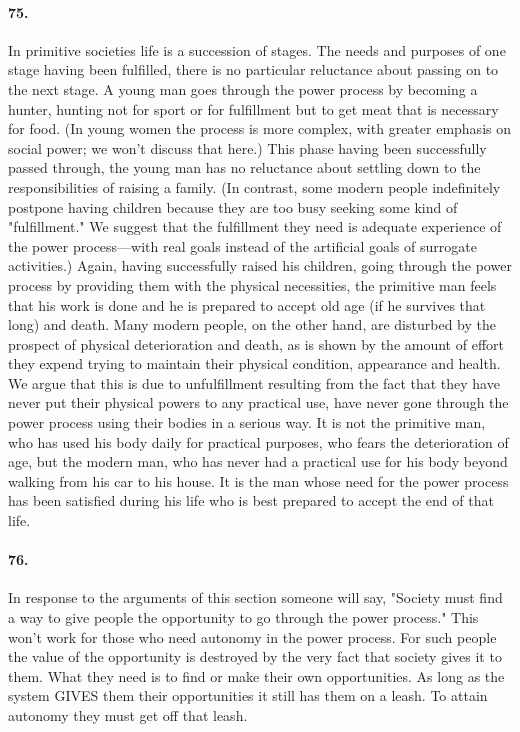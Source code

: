 \documentclass[12pt]{book}
\begin{document}
\paragraph{75.} In primitive societies life is a succession of stages. The needs and purposes of one stage having been fulfilled, there is no particular reluctance about passing on to the next stage. A young man goes through the power process by becoming a hunter, hunting not for sport or for fulfillment but to get meat that is necessary for food. (In young women the process is more complex, with greater emphasis on social power; we won't discuss that here.) This phase having been successfully passed through, the young man has no reluctance about settling down to the responsibilities of raising a family. (In contrast, some modern people indefinitely postpone having children because they are too busy seeking some kind of "fulfillment." We suggest that the fulfillment they need is adequate experience of the power process---with real goals instead of the artificial goals of surrogate activities.) Again, having successfully raised his children, going through the power process by providing them with the physical necessities, the primitive man feels that his work is done and he is prepared to accept old age (if he survives that long) and death. Many modern people, on the other hand, are disturbed by the prospect of physical deterioration and death, as is shown by the amount of effort they expend trying to maintain their physical condition, appearance and health. We argue that this is due to unfulfillment resulting from the fact that they have never put their physical powers to any practical use, have never gone through the power process using their bodies in a serious way. It is not the primitive man, who has used his body daily for practical purposes, who fears the deterioration of age, but the modern man, who has never had a practical use for his body beyond walking from his car to his house. It is the man whose need for the power process has been satisfied during his life who is best prepared to accept the end of that life.


\paragraph{76.} In response to the arguments of this section someone will say, "Society must find a way to give people the opportunity to go through the power process." This won't work for those who need autonomy in the power process. For such people the value of the opportunity is destroyed by the very fact that society gives it to them. What they need is to find or make their own opportunities. As long as the system GIVES them their opportunities it still has them on a leash. To attain autonomy they must get off that leash.
\end{document}
